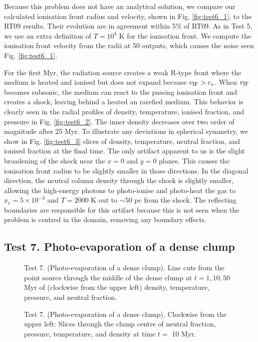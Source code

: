 \documentclass[useAMS,usenatbib]{mn2e}
\begin{document}
Because this problem does not have an analytical solution, we compare
our calculated ionisation front radius and velocity, shown in Fig.
\ref{fig:test6_1}, to the RT09 results.  Their evolution are in
agreement within 5\% of RT09.  As in Test 5, we use an extra
definition of $T=10^4$ K for the ionisation front.  We compute the
ionisation front velocity from the radii at 50 outputs, which causes
the noise seen Fig. \ref{fig:test6_1}.

For the first Myr, the radiation source creates a weak R-type front
where the medium is heated and ionised but does not expand because
$v_{\rm IF} > c_s$.  When $v_{\rm IF}$ becomes subsonic, the medium
can react to the passing ionisation front and creates a shock, leaving
behind a heated an rarefied medium.  This behavior is clearly seen in
the radial profiles of density, temperature, ionised fraction, and
pressure in Fig. \ref{fig:test6_2}.  The inner density decreases
over two order of magnitude after 25 Myr.  To illustrate any
deviations in spherical symmetry, we show in Fig. \ref{fig:test6_3}
slices of density, temperature, neutral fraction, and ionised fraction
at the final time.  The only artifact apparent to us is the slight
broadening of the shock near the $x=0$ and $y=0$ planes.  This causes
the ionisation front radius to be slightly smaller in those
directions.  In the diagonal direction, the neutral column density
through the shock is slightly smaller, allowing the high-energy
photons to photo-ionise and photo-heat the gas to $x_e = 5 \times
10^{-3}$ and $T = 2000$ K out to $\sim50$ pc from the shock.  The
reflecting boundaries are responsible for this artifact because this
is not seen when the problem is centred in the domain, removing any
boundary effects.

\subsection{Test 7. Photo-evaporation of a dense clump}

\begin{figure}
  \caption{\label{fig:test7_1} Test 7. (Photo-evaporation of a dense
    clump).  Line cuts from the point source through the middle of the
    dense clump at $t = 1, 10, 50$ Myr of (clockwise from the upper
    left) density, temperature, pressure, and neutral fraction.}
\end{figure}

\begin{figure*}
  \caption{\label{fig:test7_2} Test 7. (Photo-evaporation of a dense
    clump).  Clockwise from the upper left: Slices through the clump
    centre of neutral fraction, pressure, temperature, and density at
    time $t =$ 10 Myr.}
\end{figure*}
\end{document}
